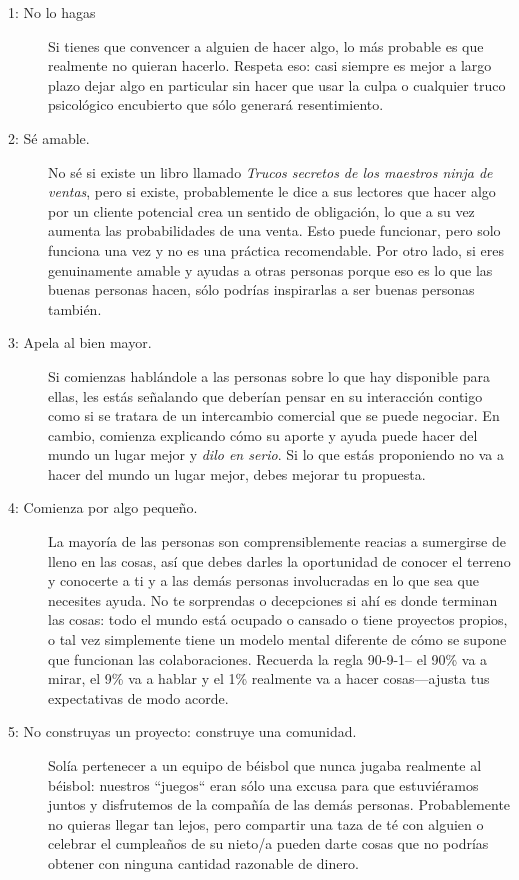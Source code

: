 \begin{description}
\item[1: No lo hagas]

Si tienes que convencer a alguien de hacer algo,
lo más probable es que realmente no quieran hacerlo.
Respeta eso:
casi siempre es mejor a largo plazo dejar algo en particular sin hacer 
que usar la culpa o cualquier truco psicológico encubierto que sólo generará resentimiento.

\item[2: Sé amable.]
No sé si existe un libro llamado
 \emph{Trucos secretos de los maestros ninja de ventas},
pero si existe,
probablemente le dice a sus lectores que hacer algo por un cliente potencial 
crea un sentido de obligación,
lo que a su vez aumenta las probabilidades de una venta.
Esto puede funcionar, pero solo funciona una vez y no es una práctica recomendable.
Por otro lado,
si eres genuinamente amable
y ayudas a otras personas porque eso es lo que las buenas personas hacen,
sólo podrías inspirarlas a ser buenas personas también.

\item[3: Apela al bien mayor.]
Si comienzas hablándole a las personas sobre lo que hay disponible para ellas,
les estás señalando que deberían pensar en su interacción contigo
como si se tratara de un intercambio comercial que se puede negociar.
En cambio,
comienza explicando cómo su aporte y ayuda puede hacer del mundo un lugar mejor 
y \emph{dilo en serio}.
Si lo que estás proponiendo no va a hacer del mundo un lugar mejor,
debes mejorar tu propuesta.

\item[4: Comienza por algo pequeño.]
La mayoría de las personas son comprensiblemente reacias a sumergirse de lleno en las cosas, 
así que debes darles  la oportunidad de conocer el terreno 
y conocerte a ti y a las demás personas involucradas
 en lo que sea que necesites ayuda.
No te sorprendas o decepciones si ahí es donde terminan las cosas:
todo el mundo está ocupado o cansado o tiene proyectos propios,
o tal vez simplemente tiene un modelo mental diferente de cómo se supone que funcionan las colaboraciones.
Recuerda la regla  90-9-1-- el 90\% va a mirar, el 9\% va a hablar y el 1\% 
realmente va a hacer cosas---ajusta tus expectativas de modo acorde.

\item[5: No construyas un proyecto: construye una comunidad.]
Solía pertenecer a un equipo de béisbol que nunca jugaba realmente al béisbol:
nuestros ``juegos`` eran sólo una excusa para que estuviéramos juntos y disfrutemos de la compañía de las demás personas.
Probablemente no quieras llegar tan lejos,
pero compartir una taza de té con alguien o celebrar el cumpleaños de su nieto/a
pueden darte cosas que no podrías obtener con ninguna cantidad razonable de dinero.


\end{description}
